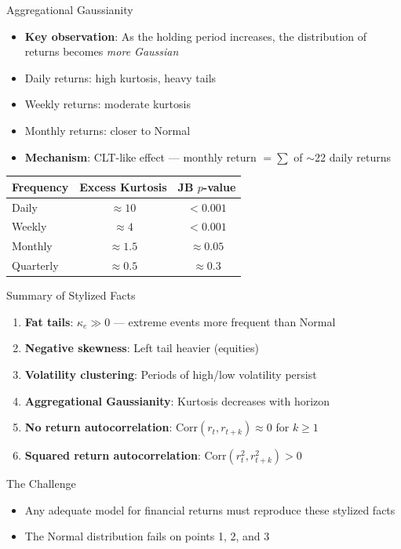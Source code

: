 \documentclass[9pt, aspectratio=169, t]{beamer}
\theoremstyle{definition}
\newcommand{\Corr}{\text{Corr}}
\begin{document}
\begin{frame}{Aggregational Gaussianity}
\begin{itemize}
\item \textbf{Key observation}: As the holding period increases, the distribution of returns becomes \textit{more Gaussian}
\item Daily returns: high kurtosis, heavy tails
\item Weekly returns: moderate kurtosis
\item Monthly returns: closer to Normal
\item \textbf{Mechanism}: CLT-like effect --- monthly return $= \sum$ of $\sim$22 daily returns
\end{itemize}

\vspace{0.2cm}
\begin{center}
\renewcommand{\arraystretch}{1.1}
\begin{tabular}{lcc}
\toprule
\textbf{Frequency} & \textbf{Excess Kurtosis} & \textbf{JB $p$-value} \\
\midrule
Daily & $\approx 10$ & $< 0.001$ \\
Weekly & $\approx 4$ & $< 0.001$ \\
Monthly & $\approx 1.5$ & $\approx 0.05$ \\
Quarterly & $\approx 0.5$ & $\approx 0.3$ \\
\bottomrule
\end{tabular}
\end{center}
\end{frame}

\begin{frame}{Summary of Stylized Facts}
\begin{enumerate}
\item \textbf{Fat tails}: $\kappa_e \gg 0$ --- extreme events more frequent than Normal
\item \textbf{Negative skewness}: Left tail heavier (equities)
\item \textbf{Volatility clustering}: Periods of high/low volatility persist
\item \textbf{Aggregational Gaussianity}: Kurtosis decreases with horizon
\item \textbf{No return autocorrelation}: $\Corr(r_t, r_{t+k}) \approx 0$ for $k \geq 1$
\item \textbf{Squared return autocorrelation}: $\Corr(r_t^2, r_{t+k}^2) > 0$
\end{enumerate}

\vspace{0.3cm}
\begin{alertblock}{The Challenge}
\begin{itemize}
\item Any adequate model for financial returns must reproduce these stylized facts
\item The Normal distribution fails on points 1, 2, and 3
\end{itemize}
\end{alertblock}
\end{frame}
\end{document}
